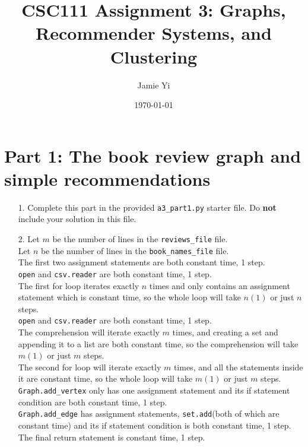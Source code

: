 \documentclass[11pt]{article}
\title{CSC111 Assignment 3: Graphs, Recommender Systems, and Clustering}
\author{Jamie Yi}
\date{\today}
\begin{document}
\maketitle

\section*{Part 1: The book review graph and simple recommendations}

\begin{enumerate}

\item[1.]
Complete this part in the provided \texttt{a3\_part1.py} starter file.
Do \textbf{not} include your solution in this file.

\item[2.]
Let $m$ be the number of lines in the \texttt{reviews\_file} file. \\
Let $n$ be the number of lines in the \texttt{book\_names\_file} file. \\

The first two assignment statements are both constant time, 1 step. \\
\texttt{open} and \texttt{csv.reader} are both constant time, 1 step. \\
The first for loop iterates exactly $n$ times and only contains an assignment statement which is constant time, so the whole loop will take $n(1)$ or just $n$ steps. \\
\texttt{open} and \texttt{csv.reader} are both constant time, 1 step. \\
The comprehension will iterate exactly $m$ times, and creating a set and appending it to a list are both constant time, so the comprehension will take $m(1)$ or just $m$ steps. \\

The second for loop will iterate exactly $m$ times, and all the statements inside it are constant time, so the whole loop will take $m(1)$ or just $m$ steps.\\
\texttt{Graph.add\_vertex} only has one assignment statement and its if statement condition are both constant time, 1 step.\\
\texttt{Graph.add\_edge} has assignment statements, \texttt{set.add}(both of which are constant time) and its if statement condition is both constant time, 1 step.\\

The final return statement is constant time, 1 step.\\


\end{enumerate}
\end{document}
